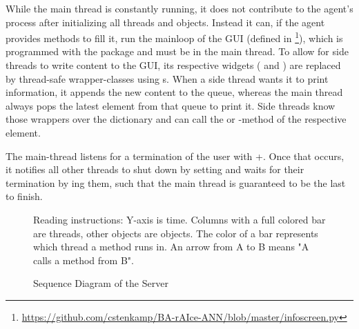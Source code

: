 While the main thread is constantly running, it does not contribute to the agent's process after initializing all threads and objects. Instead it can, if the agent provides methods to fill it, run the mainloop of the GUI (defined in \footnote{\url{https://github.com/cstenkamp/BA-rAIce-ANN/blob/master/infoscreen.py}}), which is programmed with the package  and must be in the main thread. To allow for side threads to write content to the GUI, its respective widgets ( and ) are replaced by thread-safe wrapper-classes using s. When a side thread wants it to print information, it appends the new content to the queue, whereas the main thread always pops the latest element from that queue to print it. Side threads know those wrappers over the dictionary  and can call the  or -method of the respective element.

The main-thread listens for a termination of the user with +. Once that occurs, it notifies all other threads to shut down by setting  and waits for their termination by ing them, such that the main thread is guaranteed to be the last to finish.


\begin{figure}[h!]
	\centering
	\resizebox{1.1\textwidth}{!}{
		
	}
	\caption{Sequence Diagram of the Server}
	\label{fig:sequenceserver}
	\medskip
	\scriptsize
	Reading instructions: Y-axis is time. Columns with a full colored bar are threads, other objects are objects. The color of a bar represents which thread a method runs in. An arrow from A to B means "A calls a method from B". %
\end{figure}

